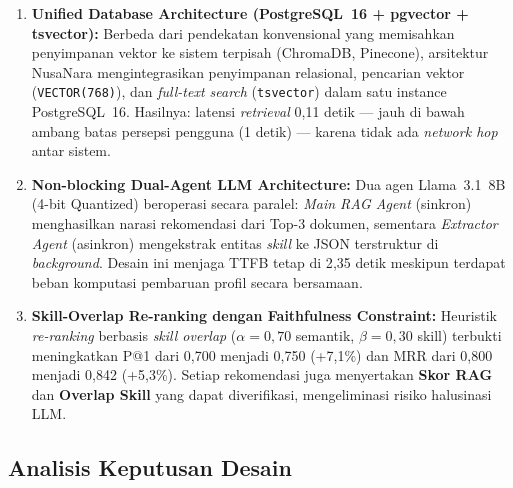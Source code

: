 \begin{enumerate}
  \item \textbf{Unified Database Architecture (PostgreSQL~16 + pgvector + tsvector):}
    Berbeda dari pendekatan konvensional yang memisahkan penyimpanan vektor ke sistem
    terpisah (ChromaDB, Pinecone), arsitektur NusaNara mengintegrasikan penyimpanan
    relasional, pencarian vektor (\texttt{VECTOR(768)}), dan \textit{full-text search}
    (\texttt{tsvector}) dalam satu instance PostgreSQL~16. Hasilnya: latensi
    \textit{retrieval} 0{,}11 detik --- jauh di bawah ambang batas persepsi pengguna
    (1 detik) --- karena tidak ada \textit{network hop} antar sistem.

  \item \textbf{Non-blocking Dual-Agent LLM Architecture:}
    Dua agen Llama~3.1~8B (4-bit Quantized) beroperasi secara paralel:
    \textit{Main RAG Agent} (sinkron) menghasilkan narasi rekomendasi dari Top-3
    dokumen, sementara \textit{Extractor Agent} (asinkron) mengekstrak entitas
    \textit{skill} ke JSON terstruktur di \textit{background}. Desain ini menjaga
    TTFB tetap di 2{,}35 detik meskipun terdapat beban komputasi pembaruan profil
    secara bersamaan.

  \item \textbf{Skill-Overlap Re-ranking dengan Faithfulness Constraint:}
    Heuristik \textit{re-ranking} berbasis \textit{skill overlap} ($\alpha{=}0{,}70$
    semantik, $\beta{=}0{,}30$ skill) terbukti meningkatkan P@1 dari 0{,}700 menjadi
    0{,}750 (+7{,}1\%) dan MRR dari 0{,}800 menjadi 0{,}842 (+5{,}3\%). Setiap
    rekomendasi juga menyertakan \textbf{Skor RAG} dan \textbf{Overlap Skill}
    yang dapat diverifikasi, mengeliminasi risiko halusinasi LLM.
\end{enumerate}

\subsection{Analisis Keputusan Desain}

